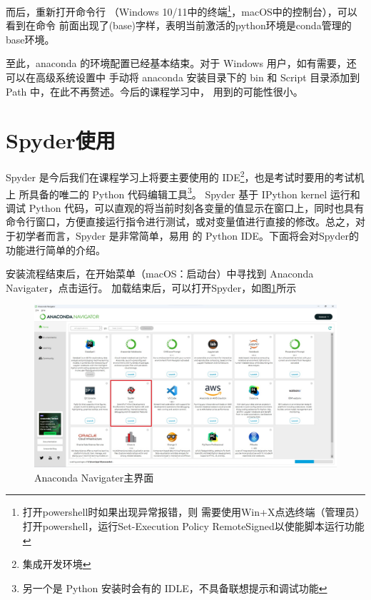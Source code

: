 \documentclass[UTF8]{ctexart}
\begin{document}
而后，重新打开命令行
（Windows 10/11中的终端\footnote{打开powershell时如果出现异常报错，则
需要使用Win+X点选终端（管理员）打开powershell，运行Set-Execution
Policy RemoteSigned以使能脚本运行功能}，macOS中的控制台），可以看到在命令
前面出现了(base)字样，表明当前激活的python环境是conda管理的base环境。

至此，anaconda 的环境配置已经基本结束。对于 Windows 用户，如有需要，还可以在高级系统设置中
手动将 anaconda 安装目录下的 bin 和 Script 目录添加到 Path 中，在此不再赘述。今后的课程学习中，
用到的可能性很小。

\section{Spyder使用}
Spyder 是今后我们在课程学习上将要主要使用的 IDE\footnote{集成开发环境}，也是考试时要用的考试机上
所具备的唯二的 Python 代码编辑工具\footnote{另一个是 Python 安装时会有的 IDLE，不具备联想提示和调试功能}。
Spyder 基于 IPython kernel 运行和调试 Python 代码，可以直观的将当前时刻各变量的值显示在窗口上，同时也具有
命令行窗口，方便直接运行指令进行测试，或对变量值进行直接的修改。总之，对于初学者而言，Spyder 是非常简单，易用
的 Python IDE。下面将会对Spyder的功能进行简单的介绍。

安装流程结束后，在开始菜单（macOS：启动台）中寻找到 Anaconda Navigater，点击运行。
加载结束后，可以打开Spyder，如图\ref{fig:navigater}所示
\begin{figure}[htbp]
    \centering
    \includegraphics*[width=0.7\linewidth]{pic/anaconda_nav_Spyder.jpg}
    \caption{Anaconda Navigater主界面}
    \label{fig:navigater}
\end{figure}
\end{document}
